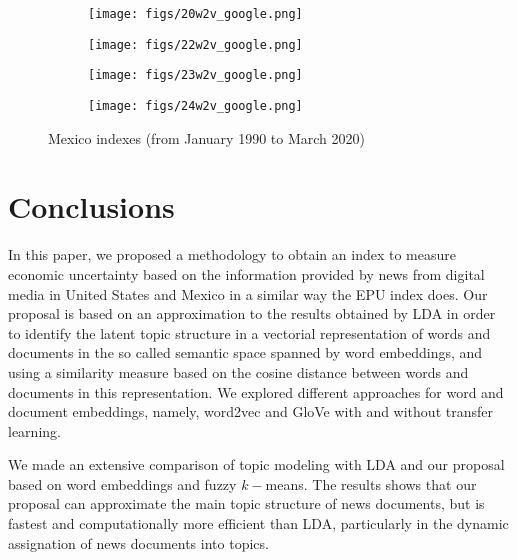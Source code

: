 \documentclass{article}
\begin{document}
\begin{figure}[ht] 
  \begin{subfigure}[b]{0.5\linewidth}
    \centering
    \texttt{[image: figs/20w2v\_google.png]}
    \caption{}
    \vspace{4ex}
  \end{subfigure}%
  \begin{subfigure}[b]{0.5\linewidth}
    \centering
    \texttt{[image: figs/22w2v\_google.png]} 
    \caption{} 
    \vspace{4ex}
  \end{subfigure} 
  \begin{subfigure}[b]{0.5\linewidth}
    \centering
    \texttt{[image: figs/23w2v\_google.png]} 
    \caption{} 
  \end{subfigure}%
  \begin{subfigure}[b]{0.5\linewidth}
    \centering
    \texttt{[image: figs/24w2v\_google.png]} 
    \caption{} 
  \end{subfigure} 

  \caption{Mexico indexes (from January 1990 to March 2020)}
 \label{fig:chap3.fig31}
\end{figure}

\section{Conclusions}
\label{sec:conclusions}

In this paper, we proposed a methodology to obtain an index to measure economic uncertainty based on the information provided by news from digital media in  United States and Mexico in a similar way the EPU index does. Our proposal is based on an approximation to the results obtained by LDA in order to identify the latent topic structure in a vectorial representation of words and documents in the so called semantic space spanned by word embeddings, and using a similarity measure based on the cosine distance between words and documents in this representation. We explored different approaches for word and document embeddings, namely, word2vec and GloVe with and without transfer learning.

We made an extensive comparison of topic modeling with LDA and our proposal based on word embeddings and fuzzy $k-$means. The results shows that our proposal can approximate the main topic structure of news documents, but is fastest and computationally more efficient than LDA, particularly in the dynamic assignation of news documents into topics. 
\end{document}

